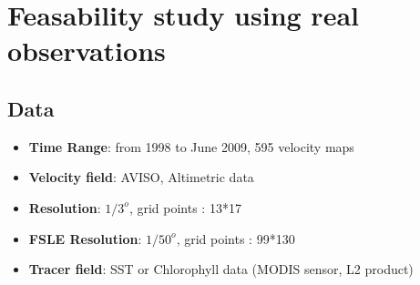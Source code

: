 \documentclass[compress,slidescentered,notes=show]{beamer}
\begin{document}
\section[Real data]{Feasability study using real observations}


	\subsection{Data}
\begin{frame}

  \begin{itemize}
    \item \textbf{Time Range}: from 1998 to June 2009, 595 velocity maps
    \item \textbf{Velocity field}: AVISO, Altimetric data
    \item \textbf{Resolution}: $1/3^o$, grid points : 13*17
    \item \textbf{FSLE Resolution}: $1/50^o$, grid points : 99*130
  \end{itemize}
  \begin{itemize}
    \item \textbf{Tracer field}: SST or Chlorophyll data (MODIS sensor, L2 product)
  \end{itemize}

\end{frame}
\end{document}
